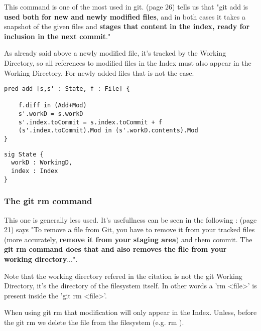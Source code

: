This command is one of the most used in git. \cite{gitComm} (page 26)
tells us that
"git add is {\bf used both for new and newly modified files},
and in both cases it takes a snapshot of the given files
and {\bf stages that content in the index, ready for inclusion
in the next commit}." \par 
As already said above a newly modified file, it's tracked by
the Working Directory, so all references to modified files in
the Index must also appear in the Working Directory. For newly
added files that is not the case.
\begin{lstlisting}
pred add [s,s' : State, f : File] {
  
    f.diff in (Add+Mod) 
    s'.workD = s.workD
    s'.index.toCommit = s.index.toCommit + f 
    (s'.index.toCommit).Mod in (s'.workD.contents).Mod
}

\end{lstlisting}

\begin{lstlisting}
sig State {
  workD : WorkingD,
  index : Index
}
\end{lstlisting}

\subsubsection{The git rm command}

This one is generally less used. It's usefullness can be
seen in the following : \cite{progit}
(page 21) says "To remove a file from Git, you have to remove it
from your tracked files (more accurately, {\bf remove it from your
staging area}) and them commit. The {\bf git rm command does that
and also removes the file from your working directory}...". \par
Note that the working directory refered in the citation is not
the git Working Directory, it's the directory of the filesystem itself.
In other words a 'rm <file>' is present inside the 'git rm <file>'. \par
When using git rm
that modification will only appear in the Index. Unless, before
the git rm we delete the file from the filesystem (e.g. rm ). \par

